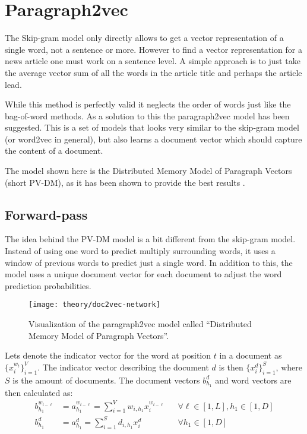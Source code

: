 
\section{Paragraph2vec}

The Skip-gram model only directly allows to get a vector representation of a single word, not a sentence or more. However to find a vector representation for a news article one must work on a sentence level. A simple approach is to just take the average vector sum of all the words in the article title and perhaps the article lead.

While this method is perfectly valid it neglects the order of words just like the bag-of-word methods. As a solution to this the paragraph2vec model has been suggested. This is a set of models that looks very similar to the skip-gram model (or word2vec in general), but also learns a document vector which should capture the content of a document.

The model shown here is the Distributed Memory Model of Paragraph Vectors (short PV-DM), as it has been shown to provide the best results \cite{doc2vec}. 

\subsection{Forward-pass}

The idea behind the PV-DM model is a bit different from the skip-gram model. Instead of using one word to predict multiply surrounding words, it uses a window of previous words to predict just a single word. In addition to this, the model uses a unique document vector for each document to adjust the word prediction probabilities.

\begin{figure}[H]
	\centering
	\texttt{[image: theory/doc2vec-network]}
	\caption{Visualization of the paragraph2vec model called ``Distributed Memory Model of Paragraph Vectors''.}
	\label{fig:theory:doc2vec:network}
\end{figure}

Lets denote the indicator vector for the word at position $t$ in a document as $\{x_i^{w_t}\}_{i=1}^V$. The indicator vector describing the document $d$ is then $\{x_i^d\}_{i=1}^S$, where $S$ is the amount of documents. The document vectors $b_{h_1}^d$ and word vectors are then calculated as:
\begin{equation}
\begin{aligned}
b_{h_1}^{w_{t-\ell}} &= a_{h_1}^{w_{t-\ell}} = \sum_{i=1}^V w_{i,h_1} x_{i}^{w_{t-\ell}} && \forall \ell \in [1, L], h_1 \in [1, D] \\
b_{h_1}^d &= a_{h_1}^d = \sum_{i=1}^S d_{i,h_1} x_{i}^d && \forall h_1 \in [1, D]
\end{aligned}
\end{equation}

